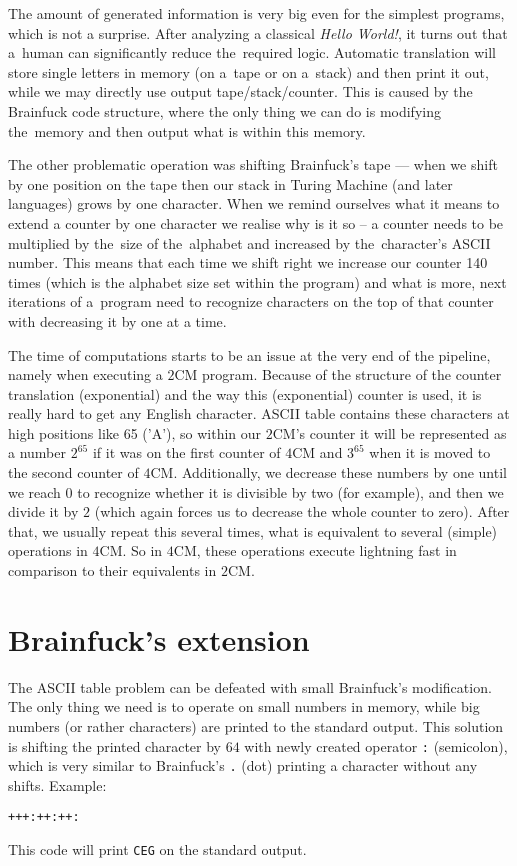 \documentclass[english,shortabstract,mgr]{iithesis}
\begin{document}
The amount of generated information is very big even for the simplest programs, which is not a surprise.
After analyzing a classical \textit{Hello World!}, it turns out that a~human can
significantly reduce the~required logic. Automatic translation will store single letters
in memory (on a~tape or on a~stack) and then print it out, while we may directly use output
tape/stack/counter. This is caused by the Brainfuck code structure, where the only thing we can do
is modifying the~memory and then output what is within this memory.

The other problematic operation was shifting Brainfuck's tape --- when we shift
by one position on the tape then our stack in Turing Machine (and later languages)
grows by one character. When we remind ourselves what it means to extend a counter by
one character we realise why is it so -- a counter needs to be multiplied by
the~size of the~alphabet and increased by the~character's ASCII number.
This means that each time we shift right we increase our counter 140 times
(which is the alphabet size set within the program) and what is more, next
iterations of a~program need to recognize characters on the top of that
counter with decreasing it by one at a time.

The time of computations starts to be an issue at the very end of the pipeline, namely
when executing a $2$CM program. Because of the structure of the counter translation
(exponential) and the way this (exponential) counter is used, it is really
hard to get any English character. ASCII table contains these characters
at high positions like 65 ('A'), so within our $2$CM's counter it will be represented
as a number $2^{65}$ if it was on the first counter of $4$CM and $3^{65}$ when
it is moved to the second counter of $4$CM. Additionally, we decrease these numbers
by one until we reach $0$ to recognize whether it is divisible by two (for example),
and then we divide it by $2$ (which again forces us to decrease the whole counter to zero).
After that, we usually repeat this several times, what is equivalent to several
(simple) operations in $4$CM. So in $4$CM, these operations execute lightning fast
in comparison to their equivalents in $2$CM.

\section{Brainfuck's extension}

The ASCII table problem can be defeated with small Brainfuck's modification. The only thing we need
is to operate on small numbers in memory, while big numbers (or rather characters) are printed to the standard output.
This solution is shifting the printed character by $64$ with newly created operator \texttt{:} (semicolon),
which is very similar to Brainfuck's \texttt{.} (dot) printing a character without any shifts. Example:
\begin{verbatim}
+++:++:++:
\end{verbatim}
This code will print \texttt{CEG} on the standard output.
\end{document}
